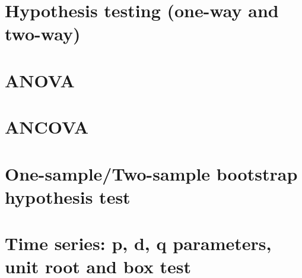 \section{Hypothesis testing (one-way and two-way)}

\section{ANOVA}

\section{ANCOVA}

\section{One-sample/Two-sample bootstrap hypothesis test}

\section{Time series: p, d, q parameters, unit root and box test}



